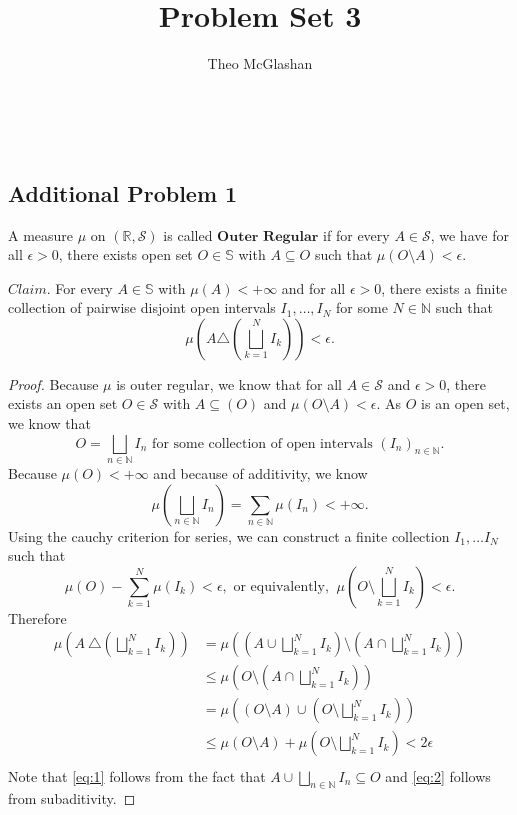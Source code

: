 \documentclass[12pt]{article}
\title{Problem Set 3}
\author{Theo McGlashan}
\date{}
\def\R{\mathbb{R}}
\def\N{\mathbb{N}}
\begin{document}
\maketitle
\newpage
\
\newpage
\subsection*{Additional Problem 1}

A measure $\mu$ on $(\R, \mathcal{S})$ is called $\textbf{Outer Regular}$ if for every $A \in \mathcal{S}$, we have for all $\epsilon > 0$, there exists open set $O \in \mathbb{S}$ with $A \subseteq O$ such that $\mu(O \setminus A) < \epsilon$.

$Claim.$ For every $A \in \mathbb{S}$ with $\mu (A) < +\infty$ and for all $\epsilon > 0$, there exists a finite collection of pairwise disjoint open intervals $I_1, \ldots, I_N$ for some $N \in \N$ such that $$\mu\left( A \triangle \left( \bigsqcup_{k=1}^N I_k\right)\right) < \epsilon.$$

\begin{proof}
    Because $\mu$ is outer regular, we know that for all $A \in \mathcal{S}$ and $\epsilon > 0$, there exists an open set $O \in \mathcal{S}$ with $A \subseteq(O)$ and $\mu(O\setminus A) < \epsilon$. As $O$ is an open set, we know that $$O = \bigsqcup_{n \in \N} I_n \text{ for some collection of open intervals } (I_n)_{n \in \N}.$$ Because $\mu(O) < +\infty$ and because of additivity, we know $$\mu \left(\bigsqcup_{n\in\N} I_n \right) = \sum_{n\in\N} \mu(I_n) < +\infty.$$ Using the cauchy criterion for series, we can construct a finite collection $I_1, \ldots I_N$ such that $$\mu(O) - \sum_{k=1}^{N} \mu(I_k) < \epsilon, \text{ or equivalently, }~ \mu\left( O \setminus \bigsqcup_{k=1}^N I_k\right) < \epsilon.$$ Therefore
    \begin{align*}
        \mu \left( A ~\triangle \left(\bigsqcup_{k=1}^N I_k \right) \right) &= \mu \left( \left( A \cup \bigsqcup_{k=1}^N I_k\right) \setminus \left( A \cap \bigsqcup_{k=1}^N I_k \right)\right) \\
        &\leq \mu \left( O \setminus \left( A \cap \bigsqcup_{k=1}^N I_k \right)\right) \tag{1}\label{eq:1} \\
        &= \mu \left( (O \setminus A) \cup \left(O \setminus \bigsqcup_{k=1}^N I_k \right)\right) \\
        &\leq \mu(O \setminus A) + \mu \left( O \setminus \bigsqcup_{k=1}^N I_k \right) < 2\epsilon \tag{2}\label{eq:2}\\
    \end{align*}
    Note that \eqref{eq:1} follows from the fact that $A \cup \bigsqcup_{n\in\N} I_n \subseteq O$ and \eqref{eq:2} follows from subaditivity.
\end{proof}
\end{document}
